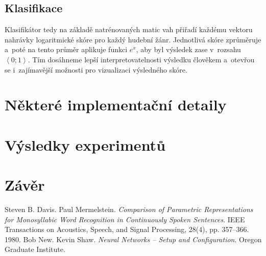 \documentclass[10pt,a4paper]{article}
\begin{document}
\subsection{Klasifikace}

Klasifikátor tedy na základě natrénovaných matic vah přiřadí každému vektoru nahrávky logaritmické skóre pro každý
hudební žánr. Jednotlivá skóre zprůměruje a~poté na tento průměr aplikuje funkci $e^x$,
aby byl výsledek zase v~rozsahu $\left<0; 1\right>$.
Tím dosáhneme lepší interpretovatelnosti výsledku člověkem a~otevřou se i~zajímavější možnosti pro vizualizaci
výsledného skóre.

\section{Některé implementační detaily}
\section{Výsledky experimentů}
\section{Závěr}

\vfill
\begin{thebibliography}{9}
   Steven B. Davis. Paul Mermelstein.
                 \emph{Comparison of Parametric Representations for Monosyllabic Word Recognition in Continuously Spoken Sentences}.
                 IEEE Transactions on Acoustics, Speech, and Signal Processing, 28(4), pp. 357–366. 1980.
   Bob New. Kevin Shaw. \emph{Neural Networks -- Setup and Configuration}. Oregon Graduate Institute.
\end{thebibliography}

\newpage
\appendix
\end{document}

